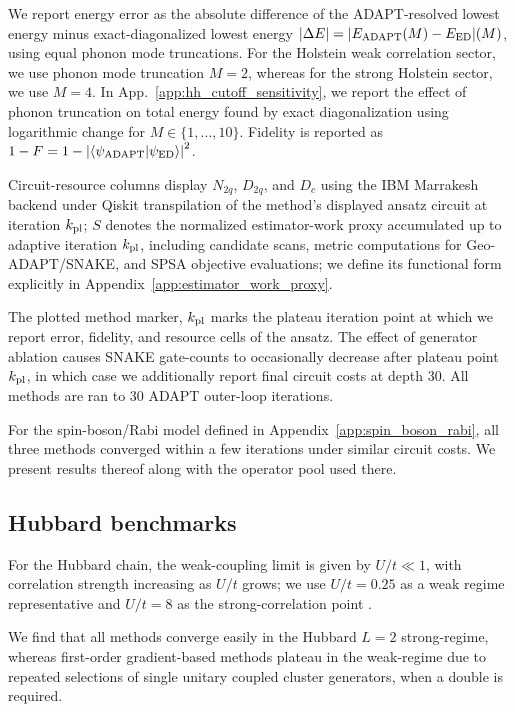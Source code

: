 \documentclass[
  reprint,
  amsmath,
  amssymb,
  aps,
  pra,
  nofootinbib,
  superscriptaddress,
  floatfix
]{revtex4-2}
\newcommand{\braket}[2]{\langle #1|#2\rangle}
\begin{document}
We report energy error as the absolute difference of the ADAPT-resolved lowest energy minus exact-diagonalized lowest energy \(|\Delta E|=|E_{\rm ADAPT}(M)-E_{\rm ED}|(M)\), using equal phonon mode truncations. For the Holstein weak correlation sector, we use phonon mode truncation $M=2$, whereas for the strong Holstein sector, we use $M=4$.
In App.~\ref{app:hh_cutoff_sensitivity}, we report the effect of phonon truncation on total energy found by exact diagonalization using logarithmic change for $M\in\{1,...,10\}.$ Fidelity is reported as \(1-F=1-\left|\braket{\psi_{\rm ADAPT}}{\psi_{\rm ED}}\right|^2\).

Circuit-resource columns display \(N_{2q}\), \(D_{2q}\), and \(D_c\) using the IBM Marrakesh backend under Qiskit transpilation of the method's displayed ansatz circuit at iteration $k_{\rm{pl}}$; \(S\) denotes the normalized estimator-work proxy accumulated up to adaptive iteration $k_{\rm{pl}}$, including candidate scans, metric computations for Geo-ADAPT/SNAKE, and SPSA objective evaluations; we define its functional form explicitly in Appendix~\ref{app:estimator_work_proxy}.


The plotted method marker, \(k_{\rm pl}\) marks the plateau iteration point at which we report error, fidelity, and resource cells of the ansatz. The effect of generator ablation causes SNAKE gate-counts to occasionally decrease after plateau point $k_{\rm{pl}}$, in which case we additionally report final circuit costs at depth 30. All methods are ran to 30 ADAPT outer-loop iterations.

For the spin-boson/Rabi model defined in Appendix~\ref{app:spin_boson_rabi}, all three methods converged within a few iterations under similar circuit costs. We present results thereof along with the operator pool used there.

\subsection{Hubbard benchmarks}

For the Hubbard chain, the weak-coupling limit is given by
\(U/t\ll 1\), with correlation strength increasing as \(U/t\) grows;
we use \(U/t=0.25\) as a weak regime representative and \(U/t=8\) as the strong-correlation point
\cite{Arovas2022Hubbard}.  

We find that all methods converge easily in the Hubbard $L=2$ strong-regime, whereas first-order gradient-based methods plateau in the weak-regime due to repeated selections of single unitary coupled cluster generators, when a double is required. 
\end{document}
